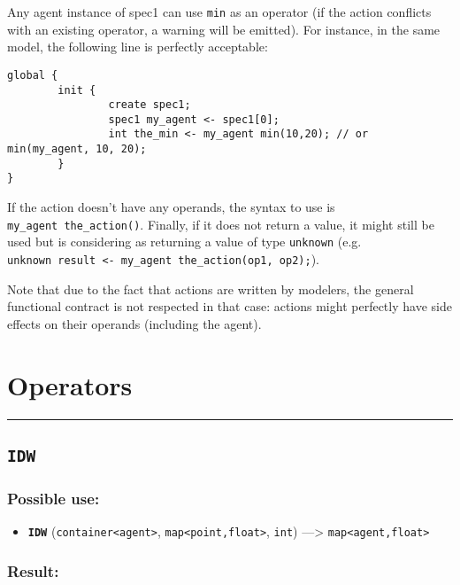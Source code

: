 \documentclass[]{book}
\providecommand{\tightlist}{%
  \setlength{\itemsep}{0pt}\setlength{\parskip}{0pt}}
\theoremstyle{definition}
\theoremstyle{definition}
\theoremstyle{definition}
\theoremstyle{remark}
\begin{document}
Any agent instance of spec1 can use \texttt{min} as an operator (if the
action conflicts with an existing operator, a warning will be emitted).
For instance, in the same model, the following line is perfectly
acceptable:

\begin{verbatim}
global {
        init {
                create spec1;
                spec1 my_agent <- spec1[0];
                int the_min <- my_agent min(10,20); // or min(my_agent, 10, 20);
        }
}
\end{verbatim}

If the action doesn't have any operands, the syntax to use is
\texttt{my\_agent\ the\_action()}. Finally, if it does not return a
value, it might still be used but is considering as returning a value of
type \texttt{unknown} (e.g.
\texttt{unknown\ result\ \textless{}-\ my\_agent\ the\_action(op1,\ op2);}).

Note that due to the fact that actions are written by modelers, the
general functional contract is not respected in that case: actions might
perfectly have side effects on their operands (including the agent).

\section{Operators}\label{operators-3}

\begin{center}\rule{0.5\linewidth}{\linethickness}\end{center}

\subsection{\texorpdfstring{\texttt{IDW}}{IDW}}\label{idw}

\subsubsection{Possible use:}\label{possible-use-263}

\begin{itemize}
\tightlist
\item
  \textbf{\texttt{IDW}}
  (\texttt{container\textless{}agent\textgreater{}},
  \texttt{map\textless{}point,float\textgreater{}}, \texttt{int})
  ---\textgreater{} \texttt{map\textless{}agent,float\textgreater{}}
\end{itemize}

\subsubsection{Result:}\label{result-253}
\end{document}
